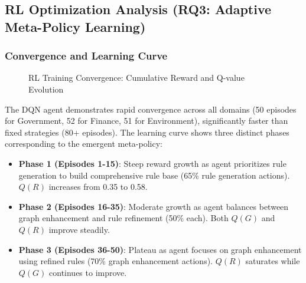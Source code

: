 \documentclass[runningheads]{llncs}
\begin{document}
\subsection{RL Optimization Analysis (RQ3: Adaptive Meta-Policy Learning)}

\subsubsection{Convergence and Learning Curve}

\begin{figure}[H]
    \centering
    \caption{RL Training Convergence: Cumulative Reward and Q-value Evolution}
    \label{fig:rl_convergence}
\end{figure}

The DQN agent demonstrates rapid convergence across all domains (50 episodes for Government, 52 for Finance, 51 for Environment), significantly faster than fixed strategies (80+ episodes). The learning curve shows three distinct phases corresponding to the emergent meta-policy:

\begin{itemize}
    \item \textbf{Phase 1 (Episodes 1-15)}: Steep reward growth as agent prioritizes rule generation to build comprehensive rule base (65\% rule generation actions). $Q(R)$ increases from 0.35 to 0.58.
    \item \textbf{Phase 2 (Episodes 16-35)}: Moderate growth as agent balances between graph enhancement and rule refinement (50\% each). Both $Q(G)$ and $Q(R)$ improve steadily.
    \item \textbf{Phase 3 (Episodes 36-50)}: Plateau as agent focuses on graph enhancement using refined rules (70\% graph enhancement actions). $Q(R)$ saturates while $Q(G)$ continues to improve.
\end{itemize}
\end{document}
